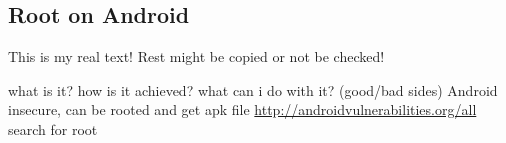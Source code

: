 \subsection{Root on Android} \label{subsection:android-root}
This is my real text! Rest might be copied or not be checked!


what is it? how is it achieved? what can i do with it? (good/bad sides)\newline
Android insecure, can be rooted and get apk file
\url{http://androidvulnerabilities.org/all} search for root\newline

